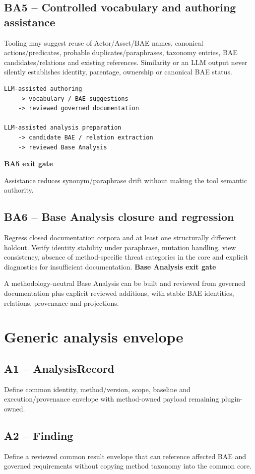 \documentclass[11pt,a4paper]{article}
\newenvironment{gate}[1]{\def\FrameCommand{\fcolorbox{ddtagreen}{ddtagray}}\MakeFramed{\advance\hsize-2\width\FrameRestore}\noindent\textbf{#1}\par\smallskip}{\endMakeFramed}
\begin{document}
\subsection{BA5 -- Controlled vocabulary and authoring assistance}
Tooling may suggest reuse of Actor/Asset/BAE names, canonical actions/predicates, probable duplicates/paraphrases, taxonomy entries, BAE candidates/relations and existing references. Similarity or an LLM output never silently establishes identity, parentage, ownership or canonical BAE status.
\begin{lstlisting}
LLM-assisted authoring
    -> vocabulary / BAE suggestions
    -> reviewed governed documentation

LLM-assisted analysis preparation
    -> candidate BAE / relation extraction
    -> reviewed Base Analysis
\end{lstlisting}
\begin{gate}{BA5 exit gate}Assistance reduces synonym/paraphrase drift without making the tool semantic authority.\end{gate}

\subsection{BA6 -- Base Analysis closure and regression}
Regress closed documentation corpora and at least one structurally different holdout. Verify identity stability under paraphrase, mutation handling, view consistency, absence of method-specific threat categories in the core and explicit diagnostics for insufficient documentation.
\begin{gate}{Base Analysis exit gate}
A methodology-neutral Base Analysis can be built and reviewed from governed documentation plus explicit reviewed additions, with stable BAE identities, relations, provenance and projections.
\end{gate}

\section{Generic analysis envelope}
\subsection{A1 -- AnalysisRecord}Define common identity, method/version, scope, baseline and execution/provenance envelope with method-owned payload remaining plugin-owned.
\subsection{A2 -- Finding}Define a reviewed common result envelope that can reference affected BAE and governed requirements without copying method taxonomy into the common core.
\end{document}
